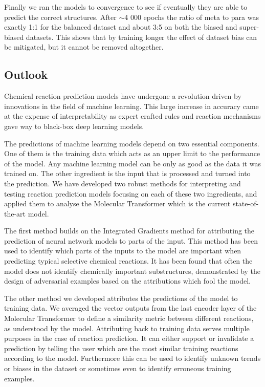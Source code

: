 Finally we ran the models to convergence to see if eventually they are able to predict the correct structures. After $\sim$4 000 epochs the ratio of meta to para was exactly 1:1 for the balanced dataset and about 3:5 on both the biased and super-biased datasets. This shows that by training longer the effect of dataset bias can be mitigated, but it cannot be removed altogether. 

\subsection{Outlook}
\label{chap:conclusion}

Chemical reaction prediction models have undergone a revolution driven by innovations in the field of machine learning. This large increase in accuracy came at the expense of interpretability as expert crafted rules and reaction mechanisms gave way to black-box deep learning models. 

The predictions of machine learning models depend on two essential components. One of them is the training data which acts as an upper limit to the performance of the model. Any machine learning model can be only as good as the data it was trained on. The other ingredient is the input that is processed and turned into the prediction. We have developed two robust methods for interpreting and testing reaction prediction models focusing on each of these two ingredients, and applied them to analyse the Molecular Transformer which is the current state-of-the-art model. 

The first method builds on the Integrated Gradients method \cite{Sundararajan2017AxiomaticNetworks} for attributing the prediction of neural network models to parts of the input. This method has been used to identify which parts of the inputs to the model are important when predicting typical selective chemical reactions. It has been found that often the model does not identify chemically important substructures, demonstrated by the design of adversarial examples based on the attributions which fool the model.

The other method we developed attributes the predictions of the model to training data. We averaged the vector outputs from the last encoder layer of the Molecular Transformer to define a similarity metric between different reactions, as understood by the model. Attributing back to training data serves multiple purposes in the case of reaction prediction. It can either support or invalidate a prediction by telling the user which are the most similar training reactions according to the model. Furthermore this can be used to identify unknown trends or biases in the dataset or sometimes even to identify erroneous training examples. 


